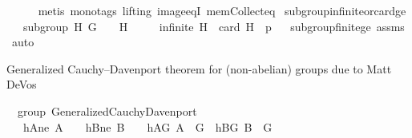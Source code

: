 \begin{isabellebody}
\ \ \ \ \isamarkupfalse%
\ {\isacharparenleft}{\kern0pt}metis\ {\isacharparenleft}{\kern0pt}mono{\isacharunderscore}{\kern0pt}tags{\isacharcomma}{\kern0pt}\ lifting{\isacharparenright}{\kern0pt}\ image{\isacharunderscore}{\kern0pt}eqI\ mem{\isacharunderscore}{\kern0pt}Collect{\isacharunderscore}{\kern0pt}eq{\isacharparenright}{\kern0pt}%
\endisatagproof
{\isafoldproof}%
%
\isadelimproof
\isanewline
%
\endisadelimproof
\isanewline
{}\isamarkupfalse%
\ subgroup{\isacharunderscore}{\kern0pt}infinite{\isacharunderscore}{\kern0pt}or{\isacharunderscore}{\kern0pt}card{\isacharunderscore}{\kern0pt}ge{\isacharcolon}{\kern0pt}\isanewline
\ \ \ {\isachardoublequoteopen}subgroup\ H\ G\ {\isacharparenleft}{\kern0pt}{\isasymcdot}{\isacharparenright}{\kern0pt}\ {\isasymone}{\isachardoublequoteclose}\ \ {\isachardoublequoteopen}H\ {\isasymnoteq}\ {\isacharbraceleft}{\kern0pt}{\isasymone}{\isacharbraceright}{\kern0pt}{\isachardoublequoteclose}\isanewline
\ \ \ {\isachardoublequoteopen}infinite\ H\ {\isasymor}\ card\ H\ {\isasymge}\ p{\isachardoublequoteclose}%
\isadelimproof
\ %
\endisadelimproof
%
\isatagproof
{}\isamarkupfalse%
\ subgroup{\isacharunderscore}{\kern0pt}finite{\isacharunderscore}{\kern0pt}ge\ assms\ \isamarkupfalse%
\ auto%
\endisatagproof
{\isafoldproof}%
%
\isadelimproof
%
\endisadelimproof
\isanewline
\isanewline
{}\isamarkupfalse%
%
\isadelimdocument
%
\endisadelimdocument
%
\isatagdocument
%
\isamarkuptrue%
%
\endisatagdocument
{\isafolddocument}%
%
\isadelimdocument
%
\endisadelimdocument
%
\begin{isamarkuptext}%
Generalized Cauchy--Davenport theorem for (non-abelian) groups due to Matt DeVos \cite{DeVos2016OnAG}%
\end{isamarkuptext}\isamarkuptrue%
\isamarkupfalse%
\ {\isacharparenleft}{\kern0pt}\ group{\isacharparenright}{\kern0pt}\ Generalized{\isacharunderscore}{\kern0pt}Cauchy{\isacharunderscore}{\kern0pt}Davenport{\isacharcolon}{\kern0pt}\isanewline
\ \ \ hAne{\isacharcolon}{\kern0pt}\ {\isachardoublequoteopen}A\ {\isasymnoteq}\ {\isacharbraceleft}{\kern0pt}{\isacharbraceright}{\kern0pt}{\isachardoublequoteclose}\ \ hBne{\isacharcolon}{\kern0pt}\ {\isachardoublequoteopen}B\ {\isasymnoteq}\ {\isacharbraceleft}{\kern0pt}{\isacharbraceright}{\kern0pt}{\isachardoublequoteclose}\ \ hAG{\isacharcolon}{\kern0pt}\ {\isachardoublequoteopen}A\ {\isasymsubseteq}\ G{\isachardoublequoteclose}\ \ hBG{\isacharcolon}{\kern0pt}\ {\isachardoublequoteopen}B\ {\isasymsubseteq}\ G{\isachardoublequoteclose}\ \isanewline

\end{isabellebody}
